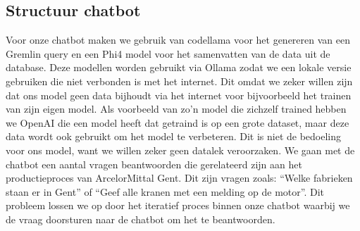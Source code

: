 \subsection{Structuur chatbot}
Voor onze chatbot maken we gebruik van codellama voor het genereren van een Gremlin query en een Phi4 model voor het samenvatten van de data uit de database.
Deze modellen worden gebruikt via Ollama zodat we een lokale versie gebruiken die niet verbonden is met het internet. Dit omdat we zeker willen zijn dat ons model geen data bijhoudt via het internet voor bijvoorbeeld het trainen van zijn eigen model.
Als voorbeeld van zo'n model die zichzelf trained hebben we OpenAI die een model heeft dat getraind is op een grote dataset, maar deze data wordt ook gebruikt om het model te verbeteren. 
Dit is niet de bedoeling voor ons model, want we willen zeker geen datalek veroorzaken.
We gaan met de chatbot een aantal vragen beantwoorden die gerelateerd zijn aan het productieproces van ArcelorMittal Gent. Dit zijn vragen zoals: ``Welke fabrieken staan er in Gent'' of ``Geef alle kranen met een melding op de motor''.
Dit probleem lossen we op door het iteratief proces binnen onze chatbot waarbij we de vraag doorsturen naar de chatbot om het te beantwoorden.



